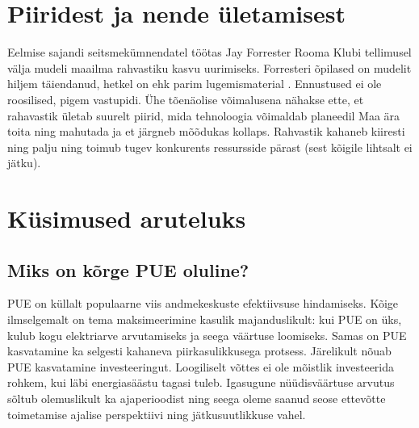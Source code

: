 \documentclass{tufte-book}
\begin{document}
\section{Piiridest ja nende ületamisest}
Eelmise sajandi seitsmekümnendatel töötas Jay Forrester Rooma Klubi tellimusel välja mudeli maailma rahvastiku kasvu uurimiseks. Forresteri õpilased on mudelit hiljem täiendanud, hetkel on ehk parim lugemismaterial \cite{meadows1992beyond}. Ennustused ei ole roosilised, pigem vastupidi. Ühe tõenäolise võimalusena nähakse ette, et rahavastik ületab suurelt piirid, mida tehnoloogia võimaldab planeedil Maa ära toita ning mahutada ja et järgneb mõõdukas kollaps. Rahvastik kahaneb kiiresti ning palju ning toimub tugev konkurents ressursside pärast (sest kõigile lihtsalt ei jätku). 

\section{Küsimused aruteluks}
\subsection{Miks on kõrge PUE oluline?}
PUE on küllalt populaarne viis andmekeskuste efektiivsuse hindamiseks. Kõige ilmselgemalt on tema maksimeerimine kasulik majanduslikult: kui PUE on üks, kulub kogu elektriarve arvutamiseks ja seega väärtuse loomiseks. Samas on PUE kasvatamine ka selgesti kahaneva piirkasulikkusega protsess. Järelikult nõuab PUE kasvatamine investeeringut. Loogiliselt võttes ei ole mõistlik investeerida rohkem, kui läbi energiasäästu tagasi tuleb. Igasugune nüüdisväärtuse arvutus sõltub olemuslikult ka ajaperioodist ning seega oleme saanud seose ettevõtte toimetamise ajalise perspektiivi ning jätkusuutlikkuse vahel. 
\end{document}
